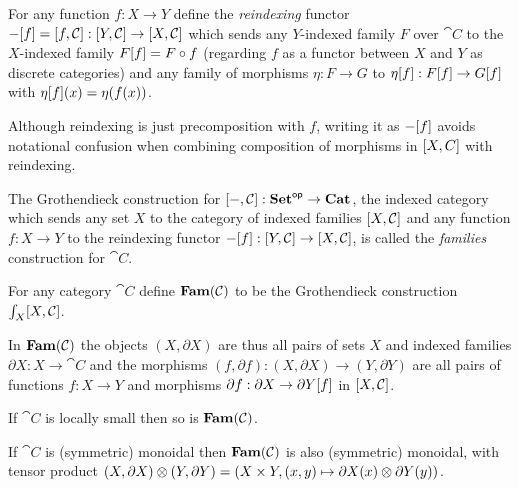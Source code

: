 \begin{definition}[Reindexing]
For any function $f: X \to Y$ define the \emph{reindexing} functor $-[f] = [f,\mathcal{C}]:
[Y,\mathcal{C}] \to [X,\mathcal{C}]$ which sends any $Y$-indexed family $F$ over $\cat{C}$ to the
$X$-indexed family $F[f] = F \circ f$ (regarding $f$ as a functor between $X$ and $Y$ as discrete
categories) and any family of morphisms $\eta: F \to G$ to $\eta[f]: F[f] \to
G[f]$ with $\eta[f](x) = \eta(f(x))$.
\end{definition}

\noindent Although reindexing is just precomposition with $f$, writing it as $-[f]$ avoids
notational confusion when combining composition of morphisms in $[X,C]$ with reindexing.

The Grothendieck construction for $[-,\mathcal{C}]: \mathbf{Set}^{\mathsf{op}} \to \mathbf{Cat}$, the indexed category which sends
any set $X$ to the category of indexed families $[X,\mathcal{C}]$ and any function $f: X \to Y$ to the
reindexing functor $-[f]: [Y,\mathcal{C}] \to [X,\mathcal{C}]$, is called the \emph{families}
construction for $\cat{C}$.

\begin{definition}
\label{def:Fam}
For any category $\cat{C}$ define $\mathbf{Fam}(\mathcal{C})$ to be the Grothendieck construction
$\int_{X}[X,\mathcal{C}]$.
\end{definition}

\noindent In $\mathbf{Fam}(\mathcal{C})$ the objects $(X, \partial X)$ are thus all pairs of sets $X$ and indexed families
$\partial X: X \to \cat{C}$ and the morphisms $(f, \partial f): (X, \partial X) \to (Y, \partial Y)$ are all
pairs of functions $f: X \to Y$ and morphisms $\partial f: \partial X \to \partial Y[f]$ in
$[X,\mathcal{C}]$.

\begin{proposition}
\label{prop:Grothendieck:fam-inherits-local-smallness}
If $\cat{C}$ is locally small then so is $\mathbf{Fam}(\mathcal{C})$.
\end{proposition}

\begin{proposition}
\label{prop:Grothendieck:fam-inherits-products}
If $\cat{C}$ is (symmetric) monoidal then $\mathbf{Fam}(\mathcal{C})$ is also (symmetric) monoidal, with tensor product
$(X, \partial X) \otimes (Y, \partial Y) = (X \times Y,(x, y) \mapsto \partial X(x) \otimes \partial Y(y))$.
\end{proposition}

